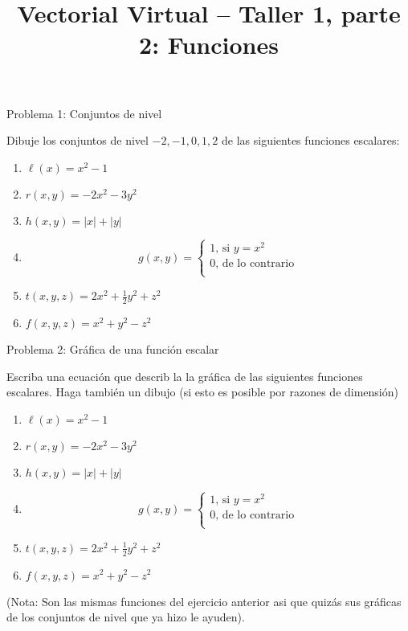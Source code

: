 \documentclass[usepdftitle=false]{beamer}
\title[]{Vectorial Virtual -- Taller 1, parte 2: Funciones}
\date{}
\begin{document}
\maketitle
\begin{frame}{Problema 1: Conjuntos de nivel}

Dibuje los conjuntos de nivel $-2,-1,0,1,2$
de las siguientes funciones escalares:

\begin{enumerate}

\item $\ell(x)=x^2-1$
\item $r(x,y)=-2x^2-3y^2$
\item $h(x,y)=|x|+|y|$
\item \[g(x,y)=\begin{cases}
1\text{, si $y=x^2$}\\
0\text{, de lo contrario}\\
\end{cases}
\]
\item $t(x,y,z)=2x^2+\tfrac{1}{2}y^2+z^2$
\item $f(x,y,z)= x^2+y^2-z^2$
\end{enumerate}

\end{frame}

\begin{frame}{Problema 2: Gr\'afica de una funci\'on escalar}

Escriba una ecuaci\'on que describ la la gr\'afica de las siguientes funciones escalares. Haga tambi\'en un dibujo (si esto es posible por razones de dimensi\'on)

\begin{enumerate}
\item $\ell(x)=x^2-1$
\item $r(x,y)=-2x^2-3y^2$
\item $h(x,y)=|x|+|y|$
\item \[g(x,y)=\begin{cases}
1\text{, si $y=x^2$}\\
0\text{, de lo contrario}\\
\end{cases}
\]

\item $t(x,y,z)=2x^2+\tfrac{1}{2}y^2+z^2$
\item $f(x,y,z)= x^2+y^2-z^2$
\end{enumerate}

(Nota: Son las mismas funciones del ejercicio anterior asi que quiz\'as sus gr\'aficas de los conjuntos de nivel que ya hizo le ayuden).

\end{frame}
\end{document}
